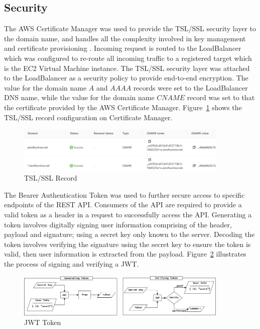 \subsection{Security}
The AWS Certificate Manager was used to provide the TSL/SSL security layer to the domain name, and handles all the complexity involved in 
key management and certificate provisioning \cite{aws_acm}. Incoming request is routed to the LoadBalancer which was configured to re-route all incoming traffic 
to a registered target which is the EC2 Virtual Machine instance. The TSL/SSL security layer was attached to the LoadBalancer as a security policy 
to provide end-to-end encryption. The value for the domain name $A$ and $AAAA$ records were set to the LoadBalancer DNS name, while the value 
for the domain name $CNAME$ record was set to that the certificate provided by the AWS Certificate Manager. 
Figure~\ref{image:ssl_record} shows the TSL/SSL record configuration on Certificate Manager. 

\begin{figure}[h!]
    \begin{center}
        \includegraphics[width=0.9\textwidth]{images/ssl_record.png}
        \caption{TSL/SSL Record}
        \label{image:ssl_record}
    \end{center}
\end{figure}

The Bearer Authentication Token was used to further secure access to specific endpoints of the REST API. Consumers of the API are required to 
provide a valid token as a header in a request to successfully access the API. Generating a token involves digitally signing user information 
comprising of the header, payload and signature; using a secret key only known to the server. Decoding the token involves verifying the signature 
using the secret key to ensure the token is valid, then user information is extracted from the payload. Figure~\ref{image:jwt} illustrates the 
process of signing and verifying a JWT. 

\begin{figure}[h!]
    \begin{center}
        \includegraphics[width=0.9\textwidth]{images/jwt.png}
        \caption{JWT Token}
        \label{image:jwt}
    \end{center}
\end{figure}


